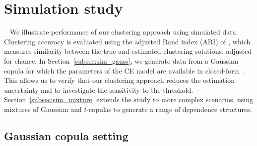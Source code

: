 \documentclass[12pt]{article}
\begin{document}
\section{Simulation study}~\label{sec:sim}
We illustrate performance of our clustering approach using simulated data. 
Clustering accuracy is evaluated using the adjusted Rand index (ARI) of \citet{Hubert1985-ys}, which measures similarity between the true and estimated clustering solutions, adjusted for chance.
In Section~\ref{subsec:sim_gauss}, we generate data from a Gaussian copula for which the parameters of the CE model are available in closed-form \citep{Keef2013}.
This allows us to verify that our clustering approach reduces the estimation uncertainty and to investigate the sensitivity to the threshold.
Section~\ref{subsec:sim_mixture} extends the study to more complex scenarios, using mixtures of Gaussian and $t$-copulas to generate a range of dependence structures. 

\subsection{Gaussian copula setting}~\label{subsec:sim_gauss}
\end{document}
